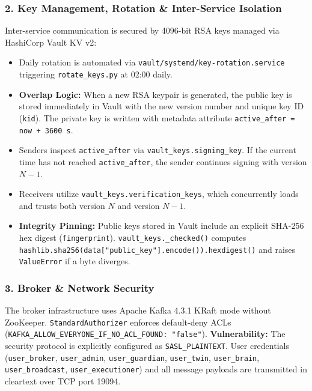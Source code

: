 \documentclass[10pt,a4paper]{report}
\begin{document}
\subsubsection{2. Key Management, Rotation \& Inter-Service Isolation}
Inter-service communication is secured by 4096-bit RSA keys managed via HashiCorp Vault KV v2:
\begin{itemize}[leftmargin=*]
  \item Daily rotation is automated via \texttt{vault/systemd/key-rotation.service} triggering \texttt{rotate\_keys.py} at 02:00 daily.
  \item \textbf{Overlap Logic:} When a new RSA keypair is generated, the public key is stored immediately in Vault with the new version number and unique key ID (\texttt{kid}). The private key is written with metadata attribute \texttt{active\_after = now + 3600\,s}.
  \item Senders inspect \texttt{active\_after} via \texttt{vault\_keys.signing\_key}. If the current time has not reached \texttt{active\_after}, the sender continues signing with version $N-1$.
  \item Receivers utilize \texttt{vault\_keys.verification\_keys}, which concurrently loads and trusts both version $N$ and version $N-1$.
  \item \textbf{Integrity Pinning:} Public keys stored in Vault include an explicit SHA-256 hex digest (\texttt{fingerprint}). \texttt{vault\_keys.\_checked()} computes \texttt{hashlib.sha256(data["public\_key"].encode()).hexdigest()} and raises \texttt{ValueError} if a byte diverges.
\end{itemize}

\subsubsection{3. Broker \& Network Security}
The broker infrastructure uses Apache Kafka 4.3.1 KRaft mode without ZooKeeper. \texttt{StandardAuthorizer} enforces default-deny ACLs (\texttt{KAFKA\_ALLOW\_EVERYONE\_IF\_NO\_ACL\_FOUND: "false"}).
\textbf{Vulnerability:} The security protocol is explicitly configured as \texttt{SASL\_PLAINTEXT}. User credentials (\texttt{user\_broker}, \texttt{user\_admin}, \texttt{user\_guardian}, \texttt{user\_twin}, \texttt{user\_brain}, \texttt{user\_broadcast}, \texttt{user\_executioner}) and all message payloads are transmitted in cleartext over TCP port 19094.
\end{document}
